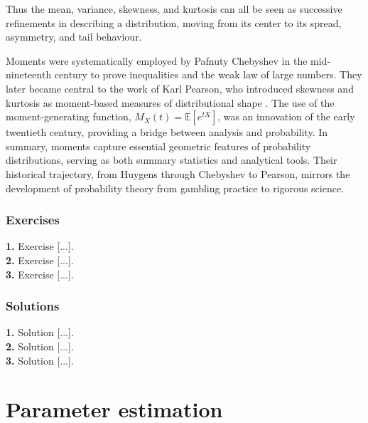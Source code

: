 \documentclass{book}
\begin{document}
Thus the mean, variance, skewness, and kurtosis can all be seen as successive refinements in describing a distribution, moving from its center to its spread, asymmetry, and tail behaviour.

\medskip

Moments were systematically employed by Pafnuty Chebyshev in the mid-nineteenth century to prove inequalities and the weak law of large numbers. They later became central to the work of Karl Pearson, who introduced skewness and kurtosis as moment-based measures of distributional shape \cite{pearson-skewness}. The use of the moment-generating function, $M_X(t) = \mathbb{E}[e^{tX}]$, was an innovation of the early twentieth century, providing a bridge between analysis and probability. In summary, moments capture essential geometric features of probability distributions, serving as both summary statistics and analytical tools. Their historical trajectory, from Huygens through Chebyshev to Pearson, mirrors the development of probability theory from gambling practice to rigorous science.

\newpage

\subsection*{Exercises}

\textbf{1.} Exercise [...].\\

\textbf{2.} Exercise [...].\\

\textbf{3.} Exercise [...].\\

\newpage

\subsection*{Solutions}

\textbf{1.} Solution [...].\\

\textbf{2.} Solution [...].\\

\textbf{3.} Solution [...].\\




\chapter{Parameter estimation}
\end{document}
